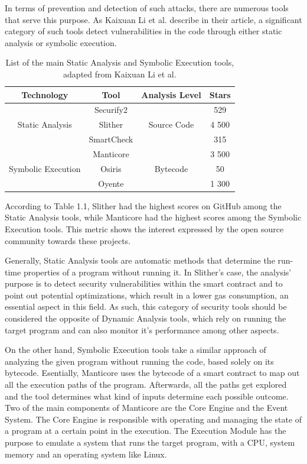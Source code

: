 In terms of prevention and detection of such attacks, there are numerous tools that serve this purpose. As Kaixuan Li et al. describe in their article\cite{staticAnalysisToolsComparison}, a significant category of such tools detect vulnerabilities in the code through either static analysis or symbolic execution.


\begin{table}[h]
\centering
\begin{tabular}{cccc}
\hline
Technology         & Tool       & Analysis Level & Stars \\ \hline
                   & Securify2  &                & 529   \\
Static Analysis    & Slither    & Source Code    & 4 500 \\
                   & SmartCheck &                & 315   \\ \hline
                   & Manticore  &                & 3 500 \\
Symbolic Execution & Osiris     & Bytecode       & 50    \\
                   & Oyente     &                & 1 300 \\ \hline
\end{tabular}
\caption{List of the main Static Analysis and Symbolic Execution tools, adapted from Kaixuan Li et al.\cite{staticAnalysisToolsComparison}}
\end{table}

According to Table 1.1, Slither had the highest scores on GitHub among the Static Analysis tools, while Manticore had the highest scores among the Symbolic Execution tools. This metric shows the interest expressed by the open source community towards these projects.

Generally, Static Analysis tools\cite{staticAnalysisDef} are automatic methods that determine the run-time properties of a program without running it. In Slither's\cite{slither} case, the analysis' purpose is to detect security vulnerabilities within the smart contract and to point out potential optimizations, which result in a lower gas consumption, an essential aspect in this field. As such, this category of security tools should be considered the opposite of Dynamic Analysis tools, which rely on running the target program and can also monitor it's performance among other aspects.

On the other hand, Symbolic Execution tools\cite{symbolicExecutionDef} take a similar approach of analyzing the given program without running the code, based solely on its bytecode. Esentially, Manticore\cite{manticore} uses the bytecode of a smart contract to map out all the execution paths of the program. Afterwards, all the paths get explored and the tool determines what kind of inputs determine each possible outcome. Two of the main components of Manticore are the Core Engine and the Event System. The Core Engine is responsible with operating and managing the state of a program at a certain point in the execution. The Execution Module has the purpose to emulate a system that runs the target program, with a CPU, system memory and an operating system like Linux.

